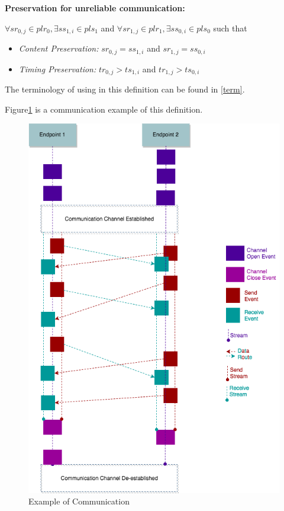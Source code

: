 \textbf{Preservation for unreliable communication:}

$\forall sr_{0,j} \in plr_{0}, \exists ss_{1,i} \in pls_{1}$ and $\forall sr_{1,j} \in plr_{1}, \exists ss_{0,i} \in pls_{0}$ such that
\begin{itemize}
 \item \textit{ Content Preservation:}  $sr_{0,j} = ss_{1,i}$ and $sr_{1,j} = ss_{0,i}$ 
 \item \textit{Timing Preservation:}    $tr_{0,j} > ts_{1,i}$ and $tr_{1,j} > ts_{0,i}$
\end{itemize}
The terminology of using in this definition can be found in \ref{term}.



Figure\ref{communicationhappen} is a communication example of this definition. 
\begin{figure}[H]
\centerline{\includegraphics[scale=0.55]{Figures/communicationdefinition}}
\caption{Example of Communication}
\label{communicationhappen}
\end{figure}

